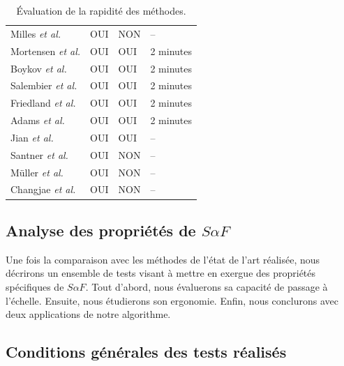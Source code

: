\begin{emodif}
 
\begin{table}[htb]
\caption{Évaluation de la rapidité des méthodes.}
\centering
\begin{tabular}{|l|p{3cm}|p{3cm}|p{3cm}|}
\hline
\cellcolor{gris}{Algorithme} & \cellcolor{gris}{Temps d’exécution}  & \cellcolor{gris}{Modification des germes}  & \cellcolor{gris}{Temps de convergence maximum} \\
\hline
Milles \textit{et al.} \cite{mille2015combination} & OUI & NON & -- \\
\hline 
Mortensen \textit{et al.} \cite{mortensen1995intelligent}& OUI & OUI & 2 minutes  \\
\hline
Boykov \textit{et al.}  \cite{boykov2001interactive}& OUI & OUI & 2 minutes  \\ 
\hline
Salembier \textit{et al.} \cite{salembier2000binary}& OUI & OUI & 2 minutes  \\
\hline
Friedland \textit{et al.} \cite{friedland2005siox} & OUI & OUI & 2 minutes  \\
\hline
Adams \textit{et al.} \cite{adams1994seeded} & OUI & OUI & 2 minutes  \\
\hline
Jian \textit{et al.} \cite{jian2016interactive} & OUI & OUI & --  \\
\hline
Santner \textit{et al.} \cite{santner2010interactive}& OUI & NON & -- \\
\hline
Müller \textit{et al.} \cite{muller2016robust}& OUI & NON & -- \\
\hline
 Changjae \textit{et al.} \cite{Changjae2017Robust} & OUI & NON & -- \\
\hline
\end{tabular}
\label{tab:eval:tempsparalgo}
\end{table}

\subsection{Analyse des propriétés de $S \alpha F$}

Une fois la comparaison avec les méthodes de l'état de l'art réalisée, nous décrirons un ensemble de tests visant à mettre en exergue des propriétés spécifiques de $S \alpha F$. Tout d'abord, nous évaluerons sa capacité de passage à l'échelle.  Ensuite, nous  étudierons son ergonomie. Enfin, nous conclurons avec deux applications de notre algorithme.

\subsection{Conditions générales des tests réalisés}


\end{emodif}

